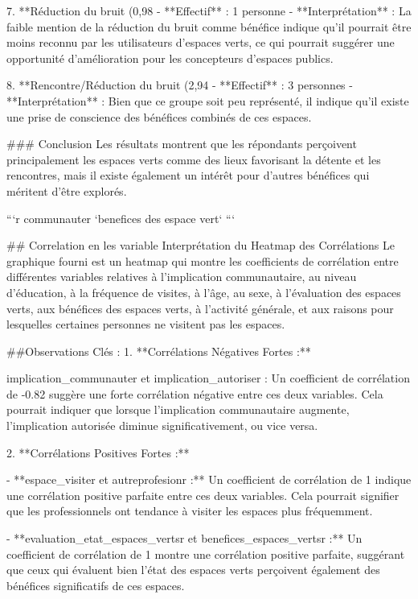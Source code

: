 7. **Réduction du bruit (0,98%
   - **Effectif** : 1 personne
   - **Interprétation** : La faible mention de la réduction du bruit comme bénéfice indique qu'il pourrait être moins reconnu par les utilisateurs d'espaces verts, ce qui pourrait suggérer une opportunité d'amélioration pour les concepteurs d'espaces publics.

8. **Rencontre/Réduction du bruit (2,94%
   - **Effectif** : 3 personnes
   - **Interprétation** : Bien que ce groupe soit peu représenté, il indique qu'il existe une prise de conscience des bénéfices combinés de ces espaces.

### Conclusion
Les résultats montrent que les répondants perçoivent principalement les espaces verts comme des lieux favorisant la détente et les rencontres, mais il existe également un intérêt pour d'autres bénéfices qui méritent d'être explorés.

```{r communauter}
`benefices des espace vert`
```

## Correlation en les variable
Interprétation du Heatmap des Corrélations
Le graphique fourni est un heatmap qui montre les coefficients de corrélation entre différentes variables relatives à l'implication communautaire, au niveau d'éducation, à la fréquence de visites, à l'âge, au sexe, à l'évaluation des espaces verts, aux bénéfices des espaces verts, à l'activité générale, et aux raisons pour lesquelles certaines personnes ne visitent pas les espaces.

##Observations Clés :
1. **Corrélations Négatives Fortes :**

implication_communauter et implication_autoriser : Un coefficient de corrélation de -0.82 suggère une forte corrélation négative entre ces deux variables. Cela pourrait indiquer que lorsque l'implication communautaire augmente, l'implication autorisée diminue significativement, ou vice versa.

2. **Corrélations Positives Fortes :**

- **espace_visiter et autreprofesionr :** Un coefficient de corrélation de 1 indique une corrélation positive parfaite entre ces deux variables. Cela pourrait signifier que les professionnels ont tendance à visiter les espaces plus fréquemment.

- **evaluation_etat_espaces_vertsr et benefices_espaces_vertsr :** Un coefficient de corrélation de 1 montre une corrélation positive parfaite, suggérant que ceux qui évaluent bien l'état des espaces verts perçoivent également des bénéfices significatifs de ces espaces.

